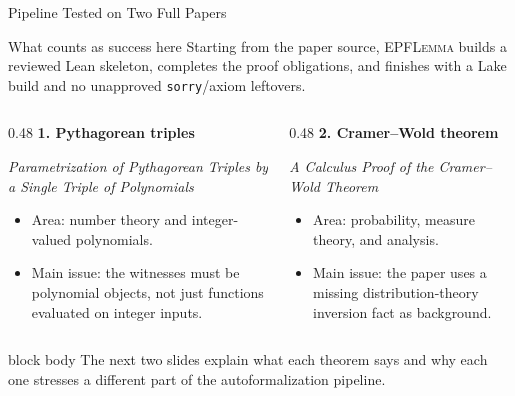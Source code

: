 \documentclass[aspectratio=169,10pt]{beamer}
\newcommand{\method}{\textsc{EPFLemma}\xspace}
\begin{document}
\begin{frame}[t]{Pipeline Tested on Two Full Papers}
\small
\begin{block}{What counts as success here}
  Starting from the paper source, \method builds a reviewed Lean skeleton,
  completes the proof obligations, and finishes with a Lake build and no
  unapproved \texttt{sorry}/axiom leftovers.
\end{block}

\vspace{1mm}
\begin{columns}[T,onlytextwidth]
  \begin{column}{0.48\textwidth}
    \textbf{1. Pythagorean triples}

    \vspace{1mm}
    \emph{Parametrization of Pythagorean Triples by a Single Triple of Polynomials}

    \vspace{1mm}
    \footnotesize
    \begin{itemize}
      \item Area: number theory and integer-valued polynomials.
      \item Main issue: the witnesses must be polynomial objects, not just
        functions evaluated on integer inputs.
    \end{itemize}
  \end{column}
  \begin{column}{0.48\textwidth}
    \textbf{2. Cramer--Wold theorem}

    \vspace{1mm}
    \emph{A Calculus Proof of the Cramer--Wold Theorem}

    \vspace{1mm}
    \footnotesize
    \begin{itemize}
      \item Area: probability, measure theory, and analysis.
      \item Main issue: the paper uses a missing distribution-theory inversion
        fact as background.
    \end{itemize}
  \end{column}
\end{columns}

\vspace{2mm}
\begin{beamercolorbox}[rounded=true,sep=2.2mm,wd=\linewidth]{block body}
  The next two slides explain what each theorem says and why each one stresses
  a different part of the autoformalization pipeline.
\end{beamercolorbox}
\end{frame}
\end{document}
